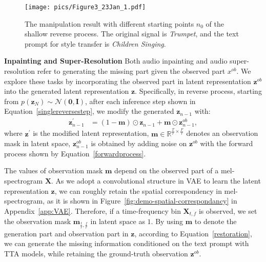 \begin{figure}[tbp]
    \centering
    \texttt{[image: pics/Figure3\_23Jan\_1.pdf]}
    \caption{The manipulation result with different starting points $n_0$ of the shallow reverse process. The original signal is \textit{Trumpet}, and the text prompt for style transfer is \textit{Children Singing}.}
    \label{fig:style-transfer-demo}
\end{figure}

\textbf{Inpainting and Super-Resolution}
\label{AI}
Both audio inpainting and audio super-resolution refer to generating the missing part given the observed part $x^{ob}$. We explore these tasks by incorporating the observed part in latent representation $\boldsymbol{z}^{ob}$ into the generated latent representation $\boldsymbol{z}$. Specifically, in reverse process, starting from $p(\boldsymbol{z}_{N})\sim\mathcal N(\boldsymbol{0},\boldsymbol{I})$, after each inference step shown in Equation~\ref{singlereversestep}, we modify the generated $\boldsymbol{z}_{n-1}$ with:
\begin{align}
\label{restoration}
\boldsymbol{z}^{\prime}_{n-1}&=(1-\boldsymbol{m})\odot\boldsymbol{z}_{n-1}+\boldsymbol{m}\odot\boldsymbol{z}^{ob}_{n-1},
\end{align}
where $\boldsymbol{z}^{\prime}$ is the modified latent representation, $\boldsymbol{m}\in \mathbb{R}^{\frac{T}{r}\times \frac{F}{r}}$ denotes an observation mask in latent space, $\boldsymbol{z}^{ob}_{n-1}$ is obtained by adding noise on $\boldsymbol{z}^{ob}$ with the forward process shown by Equation~\ref{forwardprocess}. 

The values of observation mask $\boldsymbol{m}$ depend on the observed part of a mel-spectrogram $\boldsymbol{X}$. As we adopt a convolutional structure in VAE to learn the latent representation $\boldsymbol{z}$, we can roughly retain the spatial correspondency in mel-spectrogram, as it is shown in Figure~\ref{fig:demo-spatial-correspondancy} in Appendix~\ref{app:VAE}. Therefore, if a time-frequency bin $\boldsymbol{X}_{t,f}$ is observed, we set the observation mask $\boldsymbol{m}_{\frac{t}{r},\frac{f}{r}}$ in latent space as $1$.
By using $\boldsymbol{m}$ to denote the generation part and observation part in $\boldsymbol{z}$, according to Equation~\ref{restoration}, we can generate the missing information conditioned on the text prompt with TTA models, while retaining the ground-truth observation $\boldsymbol{z}^{ob}$.

